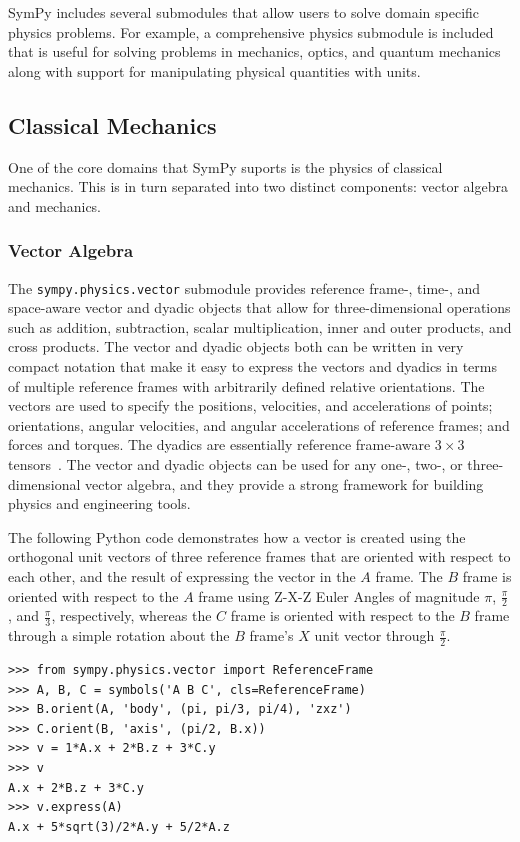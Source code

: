 SymPy includes several submodules that allow users to solve domain specific
physics problems. For example, a comprehensive physics submodule is included
that is useful for solving problems in mechanics, optics, and quantum
mechanics along with support for manipulating physical quantities with units.


\subsection{Classical Mechanics}
One of the core domains that SymPy suports is the physics of classical
mechanics. This is in turn separated into two distinct components:
vector algebra and mechanics.

\subsubsection{Vector Algebra}

The \verb|sympy.physics.vector| submodule provides reference frame-, time-,
and space-aware vector and dyadic objects that allow for three-dimensional
operations such as addition, subtraction, scalar multiplication, inner and
outer products, and cross products. The vector and dyadic objects both can be
written in very compact notation that make it easy to express the vectors and
dyadics in terms of multiple reference frames with arbitrarily defined
relative orientations. The vectors are used to specify the positions,
velocities, and accelerations of points; orientations, angular velocities, and
angular accelerations of reference frames; and forces and torques. The dyadics
are essentially reference frame-aware $3 \times 3$
tensors~\cite{tai1997generalized}. The vector and dyadic objects can be used
for any one-, two-, or three-dimensional vector algebra, and they provide a
strong framework for building physics and engineering tools.

The following Python code demonstrates how a vector is created using
the orthogonal unit vectors of three reference frames that are oriented with
respect to each other, and the result of expressing the vector in the $A$
frame. The $B$ frame is oriented with respect to the $A$ frame using Z-X-Z
Euler Angles of magnitude $\pi$, $\frac{\pi}{2}$, and
$\frac{\pi}{3}$, respectively, whereas the $C$ frame is oriented
with respect to the $B$ frame through a simple rotation about the $B$ frame's
$X$ unit vector through $\frac{\pi}{2}$.

\begin{verbatim}
>>> from sympy.physics.vector import ReferenceFrame
>>> A, B, C = symbols('A B C', cls=ReferenceFrame)
>>> B.orient(A, 'body', (pi, pi/3, pi/4), 'zxz')
>>> C.orient(B, 'axis', (pi/2, B.x))
>>> v = 1*A.x + 2*B.z + 3*C.y
>>> v
A.x + 2*B.z + 3*C.y
>>> v.express(A)
A.x + 5*sqrt(3)/2*A.y + 5/2*A.z
\end{verbatim}

